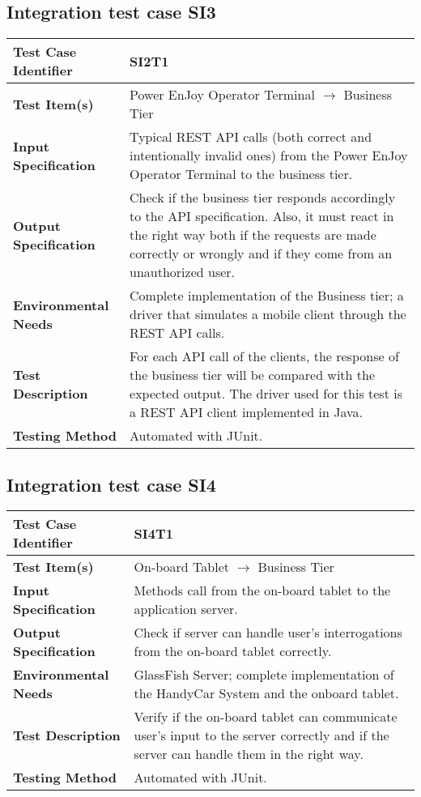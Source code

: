 \vspace{2em}

\subsection{Integration test case SI3}
\label{sec:performance-business}
\begin{tabular}{l p{}}
    \hline
    \textbf{Test Case Identifier} & SI2T1\\
    \hline
    \textbf{Test Item(s)} & Power EnJoy Operator Terminal $\rightarrow$ Business Tier\\
    \hline
    \textbf{Input Specification} & Typical REST API calls (both correct and intentionally invalid ones) from the Power EnJoy Operator Terminal to the business tier.\\
    \hline
    \textbf{Output Specification} & Check if the business tier responds accordingly to the API specification. Also, it must react in the right way both if the requests are made correctly or wrongly and if they come from an unauthorized user.\\
    \hline
    \textbf{Environmental Needs} & Complete implementation of the Business tier; a driver that simulates a mobile client through the REST API calls. \\
    \hline
    \textbf{Test Description} & For each API call of the clients, the response of the business tier will be compared with the expected output. The driver used for this test is a REST API client implemented in Java.\\
    \hline
    \textbf{Testing Method} & Automated with JUnit.\\
    \hline
\end{tabular}



\subsection{Integration test case SI4}
\label{sec:performance-business}

\begin{tabular}{l p{}}
    \hline
    \textbf{Test Case Identifier} & SI4T1\\
    \hline
    \textbf{Test Item(s)} & On-board Tablet $\rightarrow$ Business Tier\\
    \hline
    \textbf{Input Specification} & Methods call from the on-board tablet to the application server.\\
    \hline
    \textbf{Output Specification} & Check if server can handle user’s interrogations from the on-board tablet correctly.\\
    \hline
    \textbf{Environmental Needs} & GlassFish Server; complete implementation of the HandyCar System and the onboard tablet.\\
    \hline
    \textbf{Test Description} & Verify if the on-board tablet can communicate user’s input to the server correctly and if the server can handle them in the right way.\\
    \hline
    \textbf{Testing Method} & Automated with JUnit.\\
    \hline
\end{tabular}

